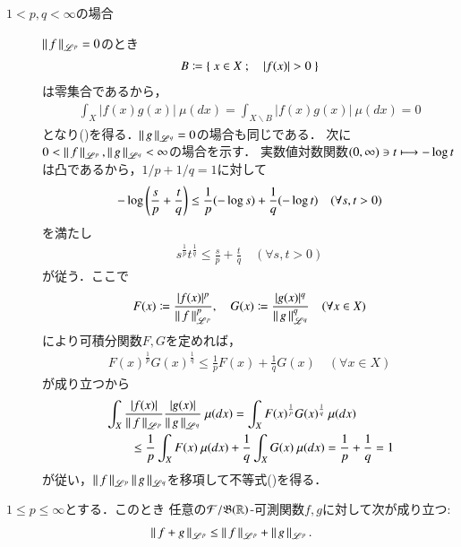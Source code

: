 \begin{prf}
\begin{description}
		\item[$1 < p,q < \infty$の場合]
			$\left\|\, f\, \right\|_{\mathscr{L}^p} = 0$のとき
			\begin{align}
				B \coloneqq \left\{\ x \in X\ ;\quad |f(x)| > 0\ \right\}
			\end{align}
			は零集合であるから，
			\begin{align}
				\int_{X} |f(x)g(x)|\ \mu(dx) = \int_{X \backslash B} |f(x)g(x)|\ \mu(dx) = 0
			\end{align}
			となり()を得る．$\left\|\, g\, \right\|_{\mathscr{L}^q} = 0$の場合も同じである．
			次に$0 < \left\|\, f\, \right\|_{\mathscr{L}^p},\left\|\, g\, \right\|_{\mathscr{L}^q} < \infty$の場合を示す．
			実数値対数関数$(0,\infty) \ni t \longmapsto -\operatorname{log} t$は凸であるから，$1/p + 1/q = 1$に対して
			\begin{align}
				-\operatorname{log} \left( \frac{s}{p} + \frac{t}{q} \right) \leq \frac{1}{p}(-\operatorname{log} s) + \frac{1}{q}(-\operatorname{log} t) \quad (\forall s,t > 0)
			\end{align}
			を満たし
			\begin{align}
				s^{\frac{1}{p}}t^{\frac{1}{q}} \leq \frac{s}{p} + \frac{t}{q} \quad (\forall s,t > 0)
			\end{align}
			が従う．ここで
			\begin{align}
				F(x) \coloneqq \frac{|f(x)|^p}{\left\|\, f\, \right\|_{\mathscr{L}^p}^p},
				\quad G(x) \coloneqq \frac{|g(x)|^q}{\left\|\, g\, \right\|_{\mathscr{L}^q}^q} \quad (\forall x \in X)
			\end{align}
			により可積分関数$F,G$を定めれば，
			\begin{align}
				F(x)^{\frac{1}{p}}G(x)^{\frac{1}{q}} \leq \frac{1}{p}F(x) + \frac{1}{q}G(x) \quad (\forall x \in X)
			\end{align}
			が成り立つから
			\begin{align}
				&\int_{X} \frac{|f(x)|}{\left\|\, f\, \right\|_{\mathscr{L}^p}} \frac{|g(x)|}{\left\|\, g\, \right\|_{\mathscr{L}^q}}\ \mu(dx)
				= \int_{X} F(x)^{\frac{1}{p}}G(x)^{\frac{1}{q}}\ \mu(dx) \\
				&\qquad \leq \frac{1}{p} \int_{X} F(x)\ \mu(dx) + \frac{1}{q} \int_{X} G(x)\ \mu(dx)
				= \frac{1}{p} + \frac{1}{q} = 1
			\end{align}
			が従い，$\left\|\, f\, \right\|_{\mathscr{L}^p}\left\|\, g\, \right\|_{\mathscr{L}^q}$を移項して不等式()を得る．
			\QED
	\end{description}
\end{prf}

\begin{screen}
	\begin{thm}[Minkowskiの不等式]
		$1 \leq p \leq \infty$とする．このとき
		任意の$\mathcal{F}/\mathfrak{B}(\mathbb{R})$-可測関数$f,g$に対して次が成り立つ:
		\begin{align}
			\left\|\, f+g\, \right\|_{\mathscr{L}^p} \leq \left\|\, f\, \right\|_{\mathscr{L}^p} + \left\|\, g\, \right\|_{\mathscr{L}^p}. \label{ineq:minkowski}
		\end{align}
		\label{thm:minkowski_inequality}
	\end{thm}
\end{screen}

